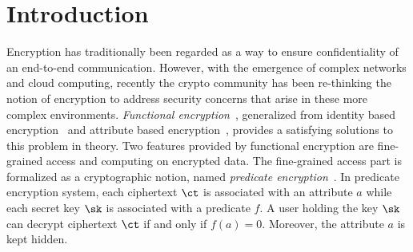 \section{Introduction}
Encryption has traditionally been regarded as a way to ensure confidentiality of an end-to-end communication. However, with the emergence of complex networks and cloud computing, recently the crypto community has been re-thinking the notion of encryption to address security concerns that arise in these more complex environments. \emph{Functional encryption}~\cite{TCC:BonSahWat11,cryptoeprint:2010:556}, generalized from identity based encryption~\cite{C:Shamir84,C:BonFra01} and attribute based encryption~\cite{CCS:GPSW06,SP:BetSahWat07}, provides a satisfying solutions to this problem in theory. Two features provided by functional encryption are fine-grained access and computing on encrypted data. The fine-grained access part is formalized as a cryptographic notion, named \emph{predicate encryption}~\cite{TCC:BonWat07,EC:KatSahWat08}. In predicate encryption system, each ciphertext $\ct$ is associated with an attribute $a$ while each secret key $\sk$ is associated with a predicate $f$. A user holding the key $\sk$ can decrypt ciphertext $\ct$ if and only if $f(a) = 0$. Moreover, the attribute $a$ is kept hidden.

